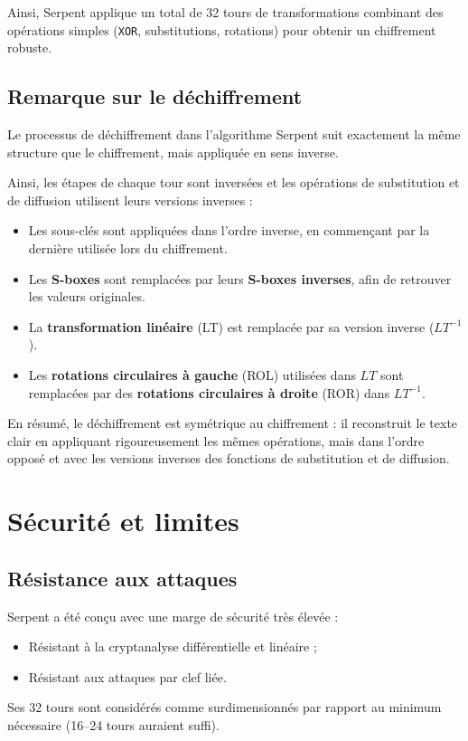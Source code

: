 \documentclass[12pt,a4paper]{report}
\begin{document}
Ainsi, Serpent applique un total de 32 tours de transformations combinant 
des opérations simples (\texttt{XOR}, substitutions, rotations) pour obtenir un chiffrement robuste.

\subsection{Remarque sur le déchiffrement}

Le processus de déchiffrement dans l’algorithme Serpent suit exactement la même structure 
que le chiffrement, mais appliquée en sens inverse.  

Ainsi, les étapes de chaque tour sont inversées et les opérations de substitution et de 
diffusion utilisent leurs versions inverses :  

\begin{itemize}
    \item Les sous-clés sont appliquées dans l’ordre inverse, en commençant par la dernière 
    utilisée lors du chiffrement.
    \item Les \textbf{S-boxes} sont remplacées par leurs \textbf{S-boxes inverses}, afin de retrouver les valeurs originales.
    \item La \textbf{transformation linéaire} (LT) est remplacée par sa version inverse (\(LT^{-1}\)).
    \item Les \textbf{rotations circulaires à gauche} (ROL) utilisées dans \(LT\) sont remplacées 
    par des \textbf{rotations circulaires à droite} (ROR) dans \(LT^{-1}\).
\end{itemize}

En résumé, le déchiffrement est symétrique au chiffrement : il reconstruit le texte clair en 
appliquant rigoureusement les mêmes opérations, mais dans l’ordre opposé et avec les versions inverses 
des fonctions de substitution et de diffusion.






\section*{Sécurité et limites}

\setcounter{subsection}{0}

\subsection{Résistance aux attaques}
Serpent a été conçu avec une marge de sécurité très élevée :
\begin{itemize}
    \item Résistant à la cryptanalyse différentielle et linéaire ;
    \item Résistant aux attaques par clef liée.
\end{itemize}
Ses 32 tours sont considérés comme surdimensionnés par rapport au minimum nécessaire (16–24 tours auraient suffi).
\end{document}
